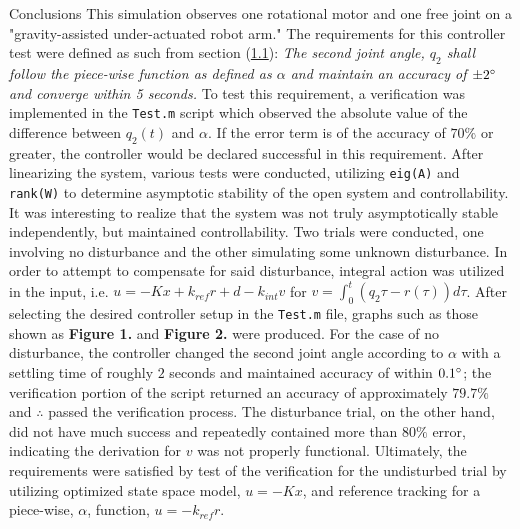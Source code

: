 \documentclass[12pt]{article}
\begin{document}
\begin{section}{Conclusions}
This simulation observes one rotational motor and one free joint on a "gravity-assisted under-actuated robot arm."  The requirements for this controller test were defined as such from section (\hyperref[sec:1.1]{1.1}):  \emph{The second joint angle, $q_2$ shall follow the piece-wise function as defined as \hyperref[alpha]{$\alpha$} and maintain an accuracy of $\pm 2\degree$ and converge within 5 seconds.}  To test this requirement, a verification was implemented in the \lstinline{Test.m} script which observed the absolute value of the difference between $q_2(t)$ and $\alpha$.  If the error term is of the accuracy of $70\%$ or greater, the controller would be declared successful in this requirement.  After linearizing the system, various tests were conducted, utilizing \lstinline{eig(A)} and \lstinline{rank(W)} to determine asymptotic stability of the open system and controllability.  It was interesting to realize that the system was not truly asymptotically stable independently, but maintained controllability.  Two trials were conducted, one involving no disturbance and the other simulating some unknown disturbance.  In order to attempt to compensate for said disturbance, integral action was utilized in the input, i.e. $u = -Kx + k_{ref}r + d - k_{int}v$ for $v = \int_0^t(q_2{\tau} - r(\tau)) d\tau$.  After selecting the desired controller setup in the \lstinline{Test.m} file, graphs such as those shown as \textbf{Figure 1.} and \textbf{Figure 2.} were produced.  For the case of no disturbance, the controller changed the second joint angle according to $\alpha$ with a settling time of roughly $2$ seconds and maintained accuracy of within $0.1 \degree$; the verification portion of the script returned an accuracy of approximately $79.7\%$ and $\therefore$ passed the verification process.  The disturbance trial, on the other hand, did not have much success and repeatedly contained more than $80\%$ error, indicating the derivation for $v$ was not properly functional.  Ultimately, the requirements were satisfied by test of the verification for the undisturbed trial by utilizing optimized state space model, $u = -Kx$, and reference tracking for a piece-wise, $\alpha$, function, $u = -k_{ref}r$.


\end{section}






\end{document}
